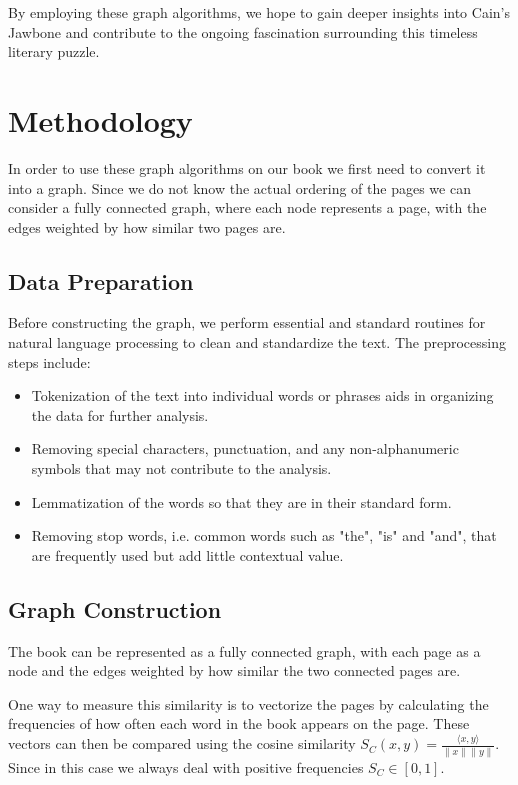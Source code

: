 \documentclass[a4paper]{article}
\begin{document}
By employing these graph algorithms, we hope to gain deeper insights into Cain's Jawbone and contribute to the ongoing fascination surrounding this timeless literary puzzle.


\section{Methodology}

In order to use these graph algorithms on our book we first need to convert it into a graph. Since we do not know the actual ordering of the pages we can consider a fully connected graph, where each node represents a page, with the edges weighted by how similar two pages are.

\subsection{Data Preparation}

Before constructing the graph, we perform essential and standard routines for natural language processing to clean and standardize the text. The preprocessing steps include:

\begin{itemize}
    \item Tokenization of the text into individual words or phrases aids in organizing the data for further analysis.
    \item Removing special characters, punctuation, and any non-alphanumeric symbols that may not contribute to the analysis.
    \item Lemmatization of the words so that they are in their standard form.
    \item Removing stop words, i.e. common words such as "the", "is" and "and", that are frequently used but add little contextual value.
\end{itemize}

\subsection{Graph Construction}

The book can be represented as a fully connected graph, with each page as a node and the edges weighted by how similar the two connected pages are.

One way to measure this similarity is to vectorize the pages by calculating the frequencies of how often each word in the book appears on the page. These vectors can then be compared using the cosine similarity $S_C(x, y) = \frac{\langle x, y \rangle}{\|x\| \|y\|}$. Since in this case we always deal with positive frequencies $S_C \in [0, 1]$.
\end{document}
